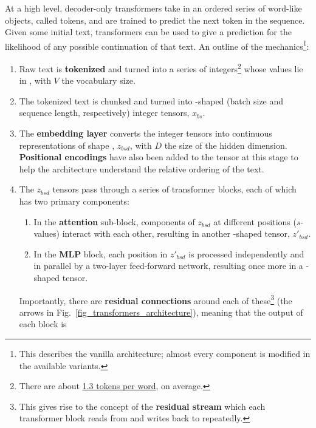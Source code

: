 \documentclass[11pt]{article}
\begin{document}
At a high level, decoder-only transformers take in an ordered series of word-like objects, called
tokens, and are trained to predict the next token in the sequence. Given some initial
text, transformers can be used to give a prediction for the likelihood of any possible continuation
of that text. An outline of the mechanics\footnote{This describes the vanilla architecture; almost
every component is modified in the available variants.}:
\begin{enumerate}
	\item Raw text is \textbf{tokenized} and turned into a series of integers\footnote{There are
		      about \href{https://github.com/ray-project/llm-numbers}{1.3 tokens per word}, on average.} whose values lie in , with $ V $ the vocabulary
	      size.
	\item The tokenized text is chunked and turned into -shaped (batch size and
	      sequence length, respectively) integer tensors, $ x _{ bs } $.
	\item The \textbf{embedding layer} converts the integer tensors into continuous representations of shape
	      , $ z _{ bsd } $, with $ D $ the size of the hidden dimension.
	      \textbf{Positional encodings} have also been added to the tensor at this stage to help the
	      architecture understand the relative ordering of the text.
	\item The $ z _{ bsd } $ tensors pass through a series of transformer blocks, each of which has
	      two primary components:
	      \begin{enumerate}
		      \item In the \textbf{attention} sub-block, components of $ z _{ bsd } $ at different
		            positions ($ s $-values) interact with each other, resulting in another -shaped
		            tensor, $  z' _{ bsd } $.
		      \item In the \textbf{MLP} block, each position in  $ z' _{ bsd } $ is processed
		            independently and in parallel by a two-layer feed-forward network, resulting once more
		            in a -shaped tensor.
	      \end{enumerate}
	      Importantly, there are \textbf{residual connections} around each of these\footnote{This
		      gives rise to the concept of the \textbf{residual stream} which each transformer block reads
              from and writes back to repeatedly.} (the arrows in
              Fig.~\ref{fig_transformers_architecture}), meaning that the output of each block is

\end{enumerate}
\end{document}
